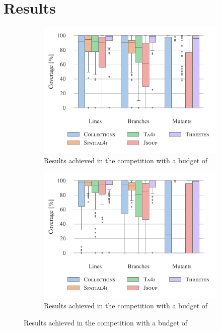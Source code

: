 \documentclass[10pt,conference]{IEEEtran}
\begin{document}
\section{Results}


\begin{figure}
  \centering

  \begin{subfigure}{\columnwidth}
    \includegraphics[width=\linewidth]{data/CoverageByBenchmark30.pdf}
    \caption{Results achieved in the competition with a budget of \budgetShort}
    \label{fig:results30}
  \end{subfigure}

  \begin{subfigure}{\columnwidth}
    \includegraphics[width=\linewidth]{data/CoverageByBenchmark120.pdf}
    \caption{Results achieved in the competition with a budget of \budgetLong}
    \label{fig:results120}
  \end{subfigure}


\end{figure}
\end{document}
